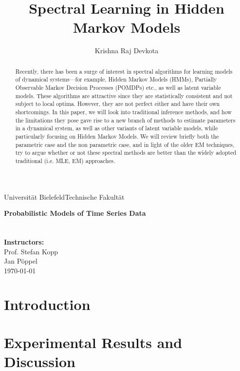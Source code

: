 \documentclass[a4paper]{article}
\title{Spectral Learning in Hidden Markov Models}
\author{Krishna Raj Devkota}
\begin{document}
\pagestyle{empty}
\begin{titlepage}
\makeatletter
	Universität Bielefeld\hfill Technische Fakultät\\[2cm]
	\begin{center}
		\textbf{\Large Probabilistic Models of Time Series Data}\\[1.5cm]
		\textbf{\huge \@title }\\[1.5cm]
		\Large \@author \\[2cm]
		\Large \textbf{Instructors:}\\
		\Large Prof. Stefan Kopp\\
		\Large Jan Pöppel\\[2cm]
		\Large\today
	\end{center}
\makeatother
\end{titlepage}

\newpage

\begin{abstract}

Recently, there has been a surge of interest in
spectral algorithms for learning models of dynamical
systems—for example, Hidden Markov Models
(HMMs), Partially Observable Markov Decision Processes
(POMDPs) etc., as well as latent variable models. These algorithms are attractive
since they are statistically consistent and not subject
to local optima. However, they are not perfect either and have their own shortcomings.
\newline
\newline
In this paper, we will look into traditional inference methods, and how the limitations they pose gave rise to a new branch of methods to estimate parameters in a dynamical system, as well as other variants of latent variable models, while particularly focusing on Hidden Markov Models. 
\newline
\newline
We will review briefly both the parametric case and the non parametric case, and in light of the older EM techniques, try to argue whether or not these spectral methods are better than the widely adopted traditional (i.e. MLE, EM) approaches.

\end{abstract}

\newpage

{\hypersetup{linkcolor=black}
\tableofcontents}

\newpage


\section{Introduction}



\section{Experimental Results and Discussion}


\newpage 

%



\end{document}
